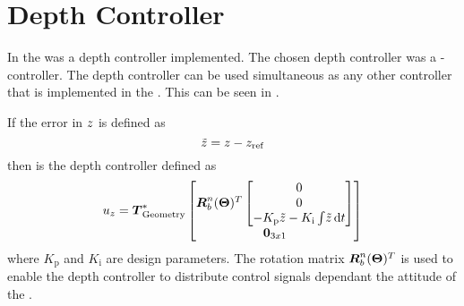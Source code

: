 \section{Depth Controller}  
In the \abbrROV was a depth controller implemented. The chosen depth controller was a \abbrPI-controller. The depth controller can be used simultaneous as any other controller that is implemented in the \abbrROV. This can be seen in .

If the error in $\zPosition$ is defined as 
\begin{equation}
\tilde{\zPosition} = \zPosition - \zPosition_{\text{ref}}
\end{equation}
then is the \abbrPI depth controller defined as
\begin{equation}
u_{\zPosition} = \thrusterGeometryOnes[*]\begin{bmatrix} \boldsymbol{R}^n_b(\eulerAngles)^T \begin{bmatrix}
0 \\
0 \\
- K_{\text{p}} \tilde{\zPosition} - K_{\text{i}}\int \! \tilde{\zPosition} \, \mathrm{d}t
\end{bmatrix} \\ \zeroCol{3}\end{bmatrix}
\end{equation}
where $K_{\text{p}}$ and $K_{\text{i}}$ are design parameters. The rotation matrix $\boldsymbol{R}^n_b(\eulerAngles)^T$ is used to enable the depth controller to distribute control signals dependant the attitude of the \abbrROV.

